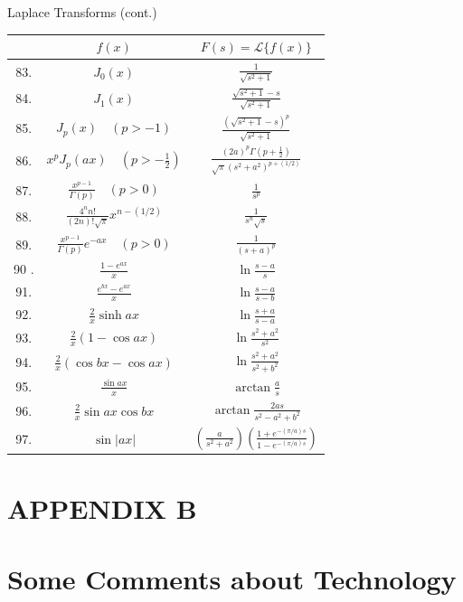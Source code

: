 \documentclass[10pt]{article}
\begin{document}
Laplace Transforms (cont.)

\begin{center}
\begin{tabular}{|c|c|c|}
\hline
 & $f(x)$ & $F(s)=\mathscr{L}\{f(x)\}$ \\
\hline
83. & $J_{0}(x)$ & $\frac{1}{\sqrt{s^{2}+1}}$ \\
\hline
84. & $J_{1}(x)$ & $\frac{\sqrt{s^{2}+1}-s}{\sqrt{s^{2}+1}}$ \\
\hline
85. & $J_{p}(x) \quad(p>-1)$ & $\frac{\left(\sqrt{s^{2}+1}-s\right)^{p}}{\sqrt{s^{2}+1}}$ \\
\hline
86. & $x^{p} J_{p}(a x) \quad\left(p>-\frac{1}{2}\right)$ & $\frac{(2 a)^{p} \Gamma\left(p+\frac{1}{2}\right)}{\sqrt{\pi}\left(s^{2}+a^{2}\right)^{p+(1 / 2)}}$ \\
\hline
87. & $\frac{x^{p-1}}{\Gamma(p)} \quad(p>0)$ & $\frac{1}{s^{p}}$ \\
\hline
88. & $\frac{4^{n} n !}{(2 n) ! \sqrt{\pi}} x^{n-(1 / 2)}$ & $\frac{1}{s^{n} \sqrt{s}}$ \\
\hline
89. & $\frac{x^{p-1}}{\Gamma(p)} e^{-a x} \quad(p>0)$ & $\frac{1}{(s+a)^{p}}$ \\
\hline
90 . & $\frac{1-e^{a x}}{x}$ & $\ln \frac{s-a}{s}$ \\
\hline
91. & $\frac{e^{b x}-e^{a x}}{x}$ & $\ln \frac{s-a}{s-b}$ \\
\hline
92. & $\frac{2}{x} \sinh a x$ & $\ln \frac{s+a}{s-a}$ \\
\hline
93. & $\frac{2}{x}(1-\cos a x)$ & $\ln \frac{s^{2}+a^{2}}{s^{2}}$ \\
\hline
94. & $\frac{2}{x}(\cos b x-\cos a x)$ & $\ln \frac{s^{2}+a^{2}}{s^{2}+b^{2}}$ \\
\hline
95. & $\frac{\sin a x}{x}$ & $\arctan \frac{a}{s}$ \\
\hline
96. & $\frac{2}{x} \sin a x \cos b x$ & $\arctan \frac{2 a s}{s^{2}-a^{2}+b^{2}}$ \\
\hline
97. & $\sin |a x|$ & $\left(\frac{a}{s^{2}+a^{2}}\right)\left(\frac{1+e^{-(\pi / a) s}}{1-e^{-(\pi / a) s}}\right)$ \\
\hline
\end{tabular}
\end{center}

\section*{APPENDIX B}
\section*{Some Comments about Technology}
\end{document}

